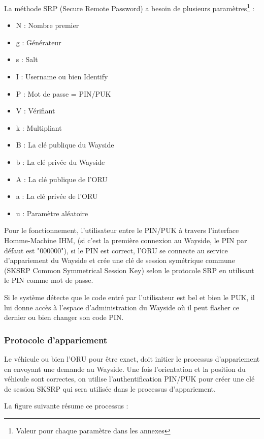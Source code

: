 La méthode SRP (Secure Remote Password) a besoin de plusieurs paramètres\footnote{Valeur pour chaque paramètre dans les annexes} : 

\begin{itemize}

	\item N : Nombre premier 
	\item g : Générateur
	\item s : Salt
	\item I : Username ou bien Identify
	\item P : Mot de passe = PIN/PUK
	\item V : Vérifiant
	\item k : Multipliant
	\item B : La clé publique du Wayside
	\item b : La clé privée du Wayside
	\item A : La clé publique de l'ORU
	\item a : La clé privée de l'ORU
	\item u : Paramètre aléatoire

\end{itemize}

Pour le fonctionnement, l'utilisateur entre le PIN/PUK à travers l'interface Homme-Machine IHM, (si c'est la première connexion au Wayside, le PIN par défaut est "000000"), si le PIN est correct, l'ORU se connecte au service d'appariement du Wayside et crée une clé de session symétrique commune (SKSRP Common Symmetrical Session Key) selon le protocole SRP en utilisant le PIN comme mot de passe.

Si le système détecte que le code entré par l'utilisateur est bel et bien le PUK, il lui donne accès à l'espace d'administration du Wayside où il peut flasher ce dernier ou bien changer son code PIN.

\subsubsection{Protocole d'appariement}

Le véhicule ou bien l'ORU pour être exact, doit initier le processus d'appariement en envoyant une demande au Wayside. Une fois l'orientation et la position du véhicule sont correctes, on utilise l'authentification PIN/PUK pour créer une clé de session SKSRP qui sera utilisée dans le processus d'appariement.

La figure suivante résume ce processus : 

